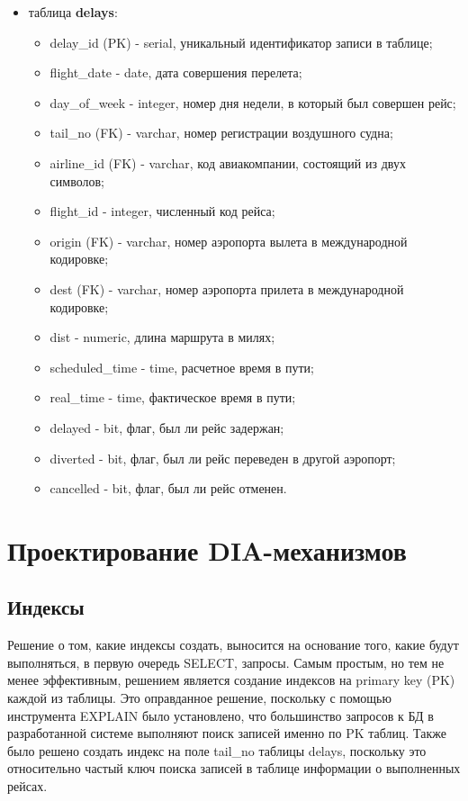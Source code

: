 \begin{itemize}
	\item таблица \textbf{delays}:
	\begin{itemize}
		\item delay\_id (PK) - serial, уникальный идентификатор записи в таблице;
		\item flight\_date - date, дата совершения перелета;
		\item day\_of\_week - integer, номер дня недели, в который был совершен рейс;
		\item tail\_no (FK) - varchar, номер регистрации воздушного судна;
		\item airline\_id (FK) - varchar, код авиакомпании, состоящий из двух символов;
		\item flight\_id - integer, численный код рейса;
		\item origin (FK) - varchar, номер аэропорта вылета в международной кодировке;
		\item dest (FK) - varchar, номер аэропорта прилета в международной кодировке;
		\item dist - numeric, длина маршрута в милях;
		\item scheduled\_time - time, расчетное время в пути;
		\item real\_time - time, фактическое время в пути;
		\item delayed - bit, флаг, был ли рейс задержан;
		\item diverted - bit, флаг, был ли рейс переведен в другой аэропорт;
		\item cancelled - bit, флаг, был ли рейс отменен.
	\end{itemize}
\end{itemize}




\section{Проектирование DIA-механизмов}

\subsection{Индексы}

Решение о том, какие индексы создать, выносится на основание того, какие будут выполняться, в первую очередь SELECT, запросы. Самым простым, но тем не менее эффективным, решением является создание индексов на primary key (PK) каждой из таблицы. Это оправданное решение, поскольку с помощью инструмента EXPLAIN было установлено, что большинство запросов к БД в разработанной системе выполняют поиск записей именно по PK таблиц. Также было решено создать индекс на поле tail\_no таблицы delays, поскольку это относительно частый ключ поиска записей в таблице информации о выполненных рейсах.

